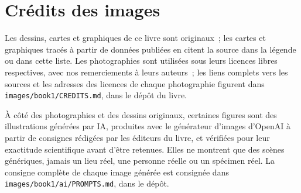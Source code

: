 \chapter*{Crédits des images}

Les dessins, cartes et graphiques de ce livre sont originaux~; les cartes
et graphiques tracés à partir de données publiées en citent la source dans
la légende ou dans cette liste. Les photographies sont utilisées sous leurs
licences libres respectives, avec nos remerciements à leurs auteurs~; les
liens complets vers les sources et les adresses des licences de chaque
photographie figurent dans \texttt{images/book1/CREDITS.md}, dans le dépôt
du livre.

\bigskip
À côté des photographies et des dessins originaux, certaines figures sont
des illustrations générées par IA, produites avec le générateur d'images
d'OpenAI à partir de consignes rédigées par les éditeurs du livre, et
vérifiées pour leur exactitude scientifique avant d'être retenues. Elles
ne montrent que des scènes génériques, jamais un lieu réel, une personne
réelle ou un spécimen réel. La consigne complète de chaque image générée
est consignée dans \texttt{images/book1/ai/PROMPTS.md}, dans le dépôt.

